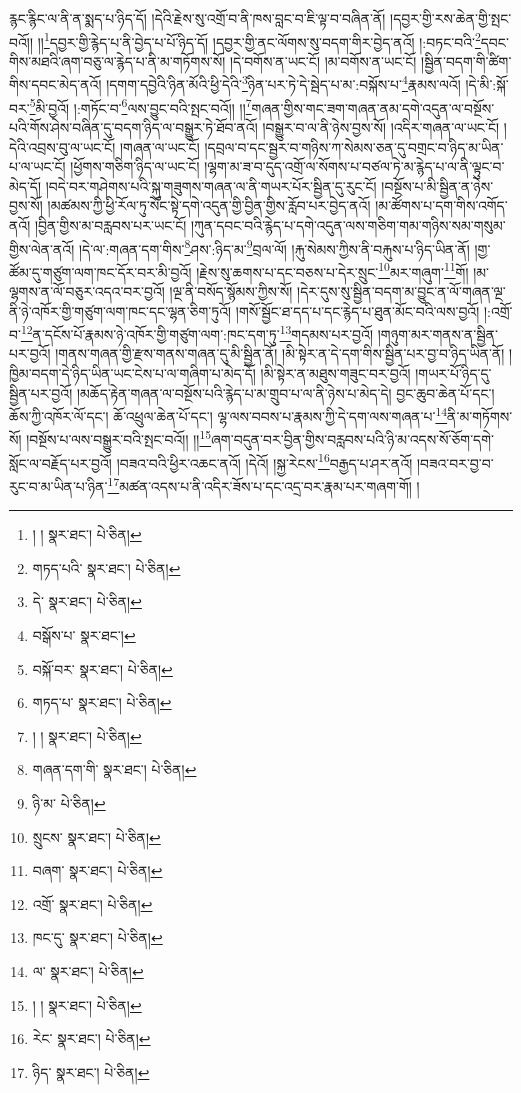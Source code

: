 རྙང་རྙིང་ལ་ནི་ན་སྨད་པ་ཉིད་དོ། །དེའི་རྗེས་སུ་འགྲོ་བ་ནི་ཁས་བླང་བ་ཇི་ལྟ་བ་བཞིན་ནོ། །དབྱར་གྱི་རས་ཆེན་གྱི་སྤང་བའོ།། །།\footnote{། །  སྣར་ཐང་།  པེ་ཅིན། }དབྱར་གྱི་རྙེད་པ་ནི་བྱེད་པ་པོ་ཉིད་དོ། །དབྱར་གྱི་ནང་ལོགས་སུ་བདག་གིར་བྱེད་ནའོ། །:བཏང་བའི་\footnote{གཏད་པའི་  སྣར་ཐང་།  པེ་ཅིན། }དབང་གིས་མཐའི་ཞག་བཅུ་ལ་རྙེད་པ་ནི་མ་གཏོགས་སོ། །དེ་བགོས་ན་ཡང་ངོ། །མ་བགོས་ན་ཡང་ངོ། །སྦྱིན་བདག་གི་ཚིག་གིས་དབང་མེད་ནའོ། །དགག་དབྱེའི་ཉིན་མོའི་ཕྱི་དེའི་\footnote{དེ་  སྣར་ཐང་།  པེ་ཅིན། }ཉིན་པར་ཏེ་དེ་སྦེད་པ་མ་:བསྐོས་པ་\footnote{བསྒོས་པ་  སྣར་ཐང་། }རྣམས་ལའོ། །དེ་མི་:སྐོ་བར་\footnote{བསྐོ་བར་  སྣར་ཐང་།  པེ་ཅིན། }མི་བྱའོ། །:གཏོང་བ་\footnote{གཏད་པ་  སྣར་ཐང་།  པེ་ཅིན། }ལས་བྱུང་བའི་སྤང་བའོ།། །།\footnote{། །  སྣར་ཐང་།  པེ་ཅིན། }གཞན་གྱིས་གང་ཟག་གཞན་ནམ་དགེ་འདུན་ལ་བསྔོས་པའི་གོས་ཤེས་བཞིན་དུ་བདག་ཉིད་ལ་བསྒྱུར་ཏེ་ཐོབ་ནའོ། །བསྒྱུར་བ་ལ་ནི་ཉེས་བྱས་སོ། །འདིར་གཞན་ལ་ཡང་ངོ། །དེའི་འབྲས་བུ་ལ་ཡང་ངོ། །གཞན་ལ་ཡང་ངོ། །དབྲལ་བ་དང་སྦྱར་བ་གཉིས་ཀ་སེམས་ཅན་དུ་བགྲང་བ་ཉིད་མ་ཡིན་པ་ལ་ཡང་ངོ། །ཕྱོགས་གཅིག་ཉིད་ལ་ཡང་ངོ། །ལྷག་མ་ཟ་བ་དུད་འགྲོ་ལ་སོགས་པ་བཙལ་ཏེ་མ་རྙེད་པ་ལ་ནི་ལྟུང་བ་མེད་དོ། །བདེ་བར་གཤེགས་པའི་སྐུ་གཟུགས་གཞན་ལ་ནི་གཡར་པོར་སྦྱིན་དུ་རུང་ངོ། །བསྔོས་པ་མི་སྦྱིན་ན་ཉེས་བྱས་སོ། །མཚམས་ཀྱི་ཕྱི་རོལ་ཏུ་སོང་སྟེ་དགེ་འདུན་གྱི་བྱིན་གྱིས་རློབ་པར་བྱེད་ནའོ། །མ་ཚོགས་པ་དག་གིས་འགོད་ནའོ། །བྱིན་གྱིས་མ་བརླབས་པར་ཡང་ངོ། །ཀུན་དབང་བའི་རྙེད་པ་དགེ་འདུན་ལས་གཅིག་གམ་གཉིས་སམ་གསུམ་གྱིས་ལེན་ནའོ། །དེ་ལ་:གཞན་དག་གིས་\footnote{གཞན་དག་གི་  སྣར་ཐང་།  པེ་ཅིན། }ཤས་:ཉིད་མ་\footnote{ཉི་མ་  པེ་ཅིན། }བྲལ་ལོ། །རྐུ་སེམས་ཀྱིས་ནི་བརྐུས་པ་ཉིད་ཡིན་ནོ། །གྱ་ཚོམ་དུ་གཙུག་ལག་ཁང་དོར་བར་མི་བྱའོ། །རྗེས་སུ་ཆགས་པ་དང་བཅས་པ་དེར་སྲུང་\footnote{སྲུངས་  སྣར་ཐང་།  པེ་ཅིན། }མར་གཞུག་\footnote{བཞག་  སྣར་ཐང་།  པེ་ཅིན། }གོ། །མ་ལྷགས་ན་ལོ་བཅུར་འདའ་བར་བྱའོ། །ལྔ་ནི་བསོད་སྙོམས་ཀྱིས་སོ། །དེར་དུས་སུ་སྦྱིན་བདག་མ་བྱུང་ན་ལོ་གཞན་ལྔ་ནི་ཉེ་འཁོར་གྱི་གཙུག་ལག་ཁང་དང་ལྷན་ཅིག་ཏུའོ། །གསོ་སྦྱོང་ཐ་དད་པ་དང་རྙེད་པ་ཐུན་མོང་བའི་ལས་བྱའོ། །:འགྲོ་བ་\footnote{འགྲོ་  སྣར་ཐང་།  པེ་ཅིན། }ན་དངོས་པོ་རྣམས་ཉེ་འཁོར་གྱི་གཙུག་ལག་:ཁང་དག་ཏུ་\footnote{ཁང་དུ་  སྣར་ཐང་།  པེ་ཅིན། }གདམས་པར་བྱའོ། །གཉུག་མར་གནས་ན་སྦྱིན་པར་བྱའོ། །གནས་གཞན་གྱི་རྫས་གནས་གཞན་དུ་མི་སྦྱིན་ནོ། །མི་སྟེར་ན་དེ་དག་གིས་སྦྱིན་པར་བྱ་བ་ཉིད་ཡིན་ནོ། །ཁྱིམ་བདག་དེ་ཉིད་ཡིན་ཡང་ངེས་པ་ལ་གཞིག་པ་མེད་དོ། །མི་སྟེར་ན་མཐུས་གཟུང་བར་བྱའོ། །གཡར་པོ་ཉིད་དུ་སྦྱིན་པར་བྱའོ། །མཆོད་རྟེན་གཞན་ལ་བསྔོས་པའི་རྙེད་པ་མ་གྲུབ་པ་ལ་ནི་ཉེས་པ་མེད་དེ། བྱང་ཆུབ་ཆེན་པོ་དང་། ཆོས་ཀྱི་འཁོར་ལོ་དང་། ཆོ་འཕྲུལ་ཆེན་པོ་དང་། ལྷ་ལས་བབས་པ་རྣམས་ཀྱི་དེ་དག་ལས་གཞན་པ་\footnote{ལ་  སྣར་ཐང་།  པེ་ཅིན། }ནི་མ་གཏོགས་སོ། །བསྔོས་པ་ལས་བསྒྱུར་བའི་སྤང་བའོ།། །།\footnote{། །  སྣར་ཐང་།  པེ་ཅིན། }ཞག་བདུན་བར་བྱིན་གྱིས་བརླབས་པའི་ཉི་མ་འདས་སོ་ཅོག་དགེ་སློང་ལ་བརྗོད་པར་བྱའོ། །བཟའ་བའི་ཕྱིར་འཆང་ནའོ། །དེའོ། །སྐྱ་རེངས་\footnote{རེང་  སྣར་ཐང་།  པེ་ཅིན། }བརྒྱད་པ་ཤར་ནའོ། །བཟའ་བར་བྱ་བ་རུང་བ་མ་ཡིན་པ་ཉིན་\footnote{ཉིད་  སྣར་ཐང་།  པེ་ཅིན། }མཚན་འདས་པ་ནི་འདིར་ཟོས་པ་དང་འདྲ་བར་རྣམ་པར་གཞག་གོ། །
